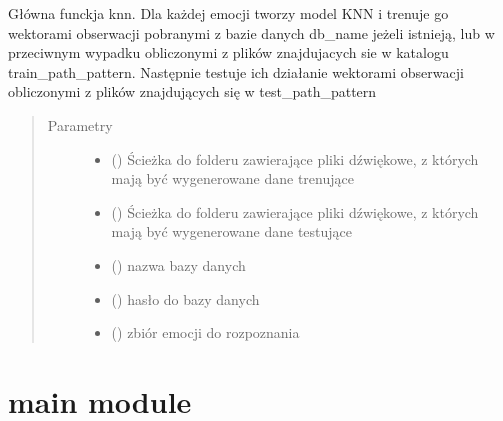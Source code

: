 \documentclass[letterpaper,10pt,polish]{sphinxmanual}
\begin{document}

\begin{fulllineitems}
\label{\detokenize{knn_main:knn_main.knn_main}}
Główna funckja knn. Dla każdej emocji tworzy model KNN i trenuje go wektorami obserwacji
pobranymi z bazie danych db\_name jeżeli istnieją, lub w przeciwnym wypadku obliczonymi z plików znajdujacych sie w katalogu
train\_path\_pattern.
Następnie testuje ich działanie wektorami obserwacji obliczonymi z plików znajdujących się w test\_path\_pattern
\begin{quote}\begin{description}
\item[{Parametry}] \leavevmode\begin{itemize}
\item {} 
 () \textendash{} Ścieżka do folderu zawierające pliki dźwiękowe, z których mają
być wygenerowane dane trenujące

\item {} 
 () \textendash{} Ścieżka do folderu zawierające pliki dźwiękowe, z których mają
być wygenerowane dane testujące

\item {} 
 () \textendash{} nazwa bazy danych

\item {} 
 () \textendash{} hasło do bazy danych

\item {} 
 () \textendash{} zbiór emocji do rozpoznania

\end{itemize}

\end{description}\end{quote}

\end{fulllineitems}



\section{main module}
\label{\detokenize{main:module-main}}\label{\detokenize{main::doc}}\label{\detokenize{main:main-module}}\label{\detokenize{main:module-project_documentation}}
\end{document}

